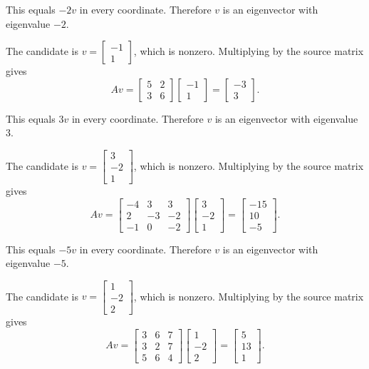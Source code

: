 This equals $-2v$ in every coordinate. Therefore $v$ is an eigenvector with eigenvalue $\boxed{-2}$.

The candidate is $v=\begin{bmatrix}-1\\1\end{bmatrix}$, which is nonzero. Multiplying by the source matrix gives
\[ Av=\begin{bmatrix}5 & 2\\3 & 6\end{bmatrix}\begin{bmatrix}-1\\1\end{bmatrix}=\begin{bmatrix}-3\\3\end{bmatrix}.\]

This equals $3v$ in every coordinate. Therefore $v$ is an eigenvector with eigenvalue $\boxed{3}$.

The candidate is $v=\begin{bmatrix}3\\-2\\1\end{bmatrix}$, which is nonzero. Multiplying by the source matrix gives
\[ Av=\begin{bmatrix}-4 & 3 & 3\\2 & -3 & -2\\-1 & 0 & -2\end{bmatrix}\begin{bmatrix}3\\-2\\1\end{bmatrix}=\begin{bmatrix}-15\\10\\-5\end{bmatrix}.\]

This equals $-5v$ in every coordinate. Therefore $v$ is an eigenvector with eigenvalue $\boxed{-5}$.

The candidate is $v=\begin{bmatrix}1\\-2\\2\end{bmatrix}$, which is nonzero. Multiplying by the source matrix gives
\[ Av=\begin{bmatrix}3 & 6 & 7\\3 & 2 & 7\\5 & 6 & 4\end{bmatrix}\begin{bmatrix}1\\-2\\2\end{bmatrix}=\begin{bmatrix}5\\13\\1\end{bmatrix}.\]

